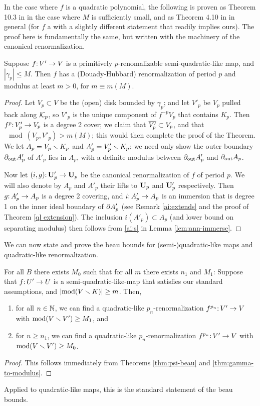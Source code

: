 In the case where $f$ is a quadratic polynomial,
the following is proven as Theorem 10.3 in \cite{McM} in the case where $M$ is sufficiently small,
and as Theorem 4.10 in \cite{towers} in general (for $f$ a with a slightly different statement that readily implies ours).
The proof here is fundamentally the same, but written with the machinery of the canonical renormalization.
\begin{theorem} \label{thm:gamma-to-modulus}
Suppose $f\mathpunct: V' \to V$ is a primitively $p$-renomalizable semi-quadratic-like map,
and $|\gamma_p| \le M$.
Then $f$ has a (Douady-Hubbard) renormalization of period $p$ and modulus at least $m > 0$, for $m \equiv m(M)$. 
\end{theorem}
\begin{proof}
Let $V_p \subset V$ be the (open) disk bounded by $\gamma_p$;
and let $V'_p$ be $V_p$ pulled back along ${\mathcal K}_p$,
so $V'_p$ is the unique component of $f^{-p}V_p$ that contains $K_p$.
Then $f^p\mathpunct: V'_p \to V_p$ is a degree 2 cover;
we claim that $\overline{V'_p} \subset V_p$,
and that $\mod(V_p, V'_p) > m(M)$;
this would then complete the proof of the Theorem.
We let $A_p = V_p \smallsetminus K_p$ and $A'_p = V'_p \smallsetminus K_p$;
we need only show the outer boundary $\partial_{\text{out}} A'_p$  of $A'_p$ lies in $A_p$,
with a definite modulus between $\partial_{\text{out}} A'_p$ and $\partial_{\text{out}} A_p$.  

Now let $(i, g)\mathpunct: \mathbf U_p' \to \mathbf U_p$ be the canonical renormalization of $f$ of period $p$.
We will also denote by $A_p$ and $A'_p$ their lifts to $\mathbf U_p$ and $\mathbf U'_p$ respectively. 
Then $g\mathpunct: A'_p \to A_p$ is a degree 2 covering,
and $i\mathpunct: A'_p \to A_p$ is an immersion that is degree 1 on the inner ideal boundary of $\partial A'_p$
(see Remark \ref{ai:extends} and the proof of Theorem \ref{ql extension}). 
The inclusion $i(A'_p) \subset A_p$ (and lower bound on separating modulus) then follows from \eqref{ai:s} in Lemma \ref{lem:ann-immerse}.
\end{proof}
 
We can now state and prove the beau bounds for (semi-)quadratic-like maps and quadratic-like renormalization.
\begin{theorem} \label{thm:a-priori-bounds}
For all $B$ there exists $M_0$ such that for all $m$ there exists $n_1$ and $M_1$:
Suppose that $f\mathpunct: U' \to U$ is a semi-quadratic-like-map that satisfies our standard assumptions, and $\left\vert \operatorname{mod}(V \smallsetminus K) \right\vert \ge m$.
Then,
\begin{enumerate}
\item
for all $n\in {\Bbb N}$, 
we can find a quadratic-like $p_n$-renormalization $f^{p_n}\mathpunct: V' \to V$ with $\operatorname{mod}(V\smallsetminus V') \ge M_1$, and 
\item
for $n \ge n_1$, 
we can find a quadratic-like $p_n$-renormalization $f^{p_n}\mathpunct: V' \to V$ with $\operatorname{mod}(V\smallsetminus V') \ge M_0$.
\end{enumerate}
\end{theorem}
\begin{proof}
This follows immediately from Theorems \ref{thm:psi-beau} and \ref{thm:gamma-to-modulus}.
\end{proof}
Applied to quadratic-like maps, this is the standard statement of the beau bounds.

